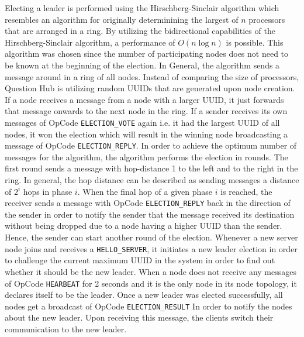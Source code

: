 \documentclass[runningheads]{llncs}
\begin{document}
Electing a leader is performed using the Hirschberg-Sinclair algorithm which
resembles an algorithm for originally determinining the largest of $n$
processors that are arranged in a ring.
By utilizing the bidirectional capabilities of the Hirschberg-Sinclair
algorithm, a performance of $O(n\log{}n)$ is possible.\cite{hirschberg1980decentralized}
\newline
\newline
This algorithm was chosen since the number of participating nodes
does not need to be known at the beginning of the election.
In General, the algorithm sends a message around in a ring of all nodes.
Instead of comparing the size of processors, Question Hub is utilizing
random UUIDs that are generated upon node creation. If a node receives a
message from a node with a larger UUID, it just forwards that message onwards
to the next node in the ring. If a sender receives its own messages of OpCode 
\texttt{ELECTION\_VOTE} again i.e. it had the largest UUID of all nodes, it won the
election which will result in the winning node broadcasting a message of
OpCode \texttt{ELECTION\_REPLY}. 
\newline
\newline
In order to achieve the optimum number of messages
for the algorithm, the algorithm performs the election in rounds. The first
round sends a message with hop-distance 1 to the left and to the right in the
ring. In general, the hop distance can be described as sending messages a
distance of $2^i$ hops in phase $i$. When the final hop of a given phase $i$ is
reached, the receiver sends a message with OpCode \texttt{ELECTION\_REPLY} back in the
direction of the sender in order to notify the sender that the message received
its destination without being dropped due to a node having a higher UUID than
the sender. Hence, the sender can start another round of the election.
\newline
\newline
Whenever a new server node joins and receives a \texttt{HELLO\_SERVER}, it initiates a
new leader election in order to challenge the current maximum UUID in the
system in order to find out whether it should be the new leader.
When a node does not receive any messages of OpCode \texttt{HEARBEAT} for 2 seconds
and it is the only node in its node topology, it declares itself to be the
leader. Once a new leader was elected successfully, all nodes get a broadcast of
OpCode \texttt{ELECTION\_RESULT} In order to notify the nodes about the new leader.
Upon receiving this message, the clients switch their communication to the
new leader.
\end{document}
